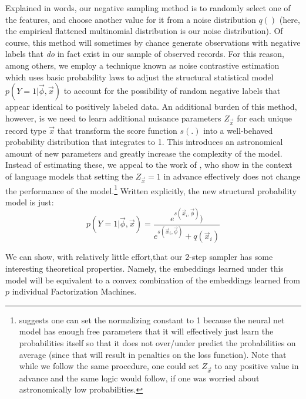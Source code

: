 \documentclass{article} %
\renewcommand{\cite}[1]{\citep{#1}}
\begin{document}
Explained in words, our negative sampling method is to randomly select one of the features, and choose another value for it from a noise distribution $q()$ (here, the empirical flattened multinomial distribution is our noise distribution). Of course, this method will sometimes by chance generate observations with negative labels that \textit{do} in fact exist in our sample of observed records. For this reason, among others, we employ  a technique known as noise contrastive estimation\cite{nce} which uses basic probability laws to adjust the structural statistical model $p(Y=1|\vec{\phi},\vec{x})$ to account for the possibility of random negative labels that appear identical to positively labeled data. An additional burden of this method, however, is we need to learn additional nuisance parameters $Z_{\vec{x}}$ for each unique record type $\vec{x}$ that transform the score function $s(.)$ into a well-behaved probability distribution that integrates to 1. This introduces an astronomical amount of new parameters and greatly increase the complexity of the model. Instead of estimating these, we appeal to the work of \cite{fastnnlang}, who show in the context of language models that setting the $Z_{\vec{x}}=1$ in advance effectively does not change the performance of the model.\footnote{\cite{fastnnlang} suggests one can set the normalizing constant to 1 because the neural net model has enough free parameters that it will effectively just learn the probabilities itself so that it does not over/under predict the probabilities on average (since that will result in penalties on the loss function). Note that while we follow the same procedure, one could set $Z_{\vec{x}}$ to any positive value in advance and the same logic would follow, if one was worried about astronomically low probabilities.}  Written explicitly, the new structural probability model is just:
\[p(Y=1|\vec{\phi},\vec{x}) = \frac{e^{s(\vec{x}_i,\vec{\phi}) })}{e^{s(\vec{x}_i,\vec{\phi}) } + q(\vec{x}_i) }\]

We can show, with relatively little effort,that our 2-step sampler has some interesting theoretical properties. Namely, the embeddings learned under this model will be equivalent to a convex combination of the embeddings learned from $p$ individual Factorization Machines. 
\end{document}
